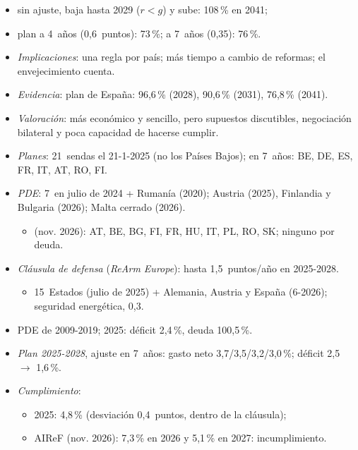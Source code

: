 \documentclass{article}
\begin{document}
\begin{columnas}
\begin{itemize}
\begin{itemize}
  \item sin ajuste, baja hasta 2029 ($r<g$) y sube: 108\,\% en 2041;
  \item plan a 4~años (0,6~puntos): 73\,\%; a 7~años (0,35): 76\,\%.
  \end{itemize}
\end{itemize}
\begin{itemize}
\item \emph{Implicaciones}: una regla por país; más tiempo a cambio de reformas; el envejecimiento cuenta.
\item \emph{Evidencia}: plan de España: 96,6\,\% (2028), 90,6\,\% (2031), 76,8\,\% (2041).
\item \emph{Valoración}: más económico y sencillo, pero supuestos discutibles, negociación bilateral y poca capacidad de hacerse cumplir.
\end{itemize}
\begin{itemize}
\item \emph{Planes}: 21~sendas el 21-1-2025 (no los Países Bajos); en 7~años: BE, DE, ES, FR, IT, AT, RO, FI.
\item \emph{PDE}: 7~en julio de 2024 + Rumanía (2020); Austria (2025), Finlandia y Bulgaria (2026); Malta cerrado (2026).
  \begin{itemize}
  \item {} (nov. 2026): AT, BE, BG, FI, FR, HU, IT, PL, RO, SK; ninguno por deuda.
  \end{itemize}
\item \emph{Cláusula de defensa} (\emph{ReArm Europe}): hasta 1,5~puntos/año en 2025-2028.
  \begin{itemize}
  \item 15~Estados (julio de 2025) + Alemania, Austria y España (6-2026); seguridad energética, 0,3.
  \end{itemize}
\end{itemize}
\begin{itemize}
\item PDE de 2009-2019; 2025: déficit 2,4\,\%, deuda 100,5\,\%.
\item \emph{Plan 2025-2028}, ajuste en 7~años: gasto neto 3,7/3,5/3,2/3,0\,\%; déficit 2,5 $\to$ 1,6\,\%.
\item \emph{Cumplimiento}:
  \begin{itemize}
  \item 2025: 4,8\,\% (desviación 0,4~puntos, dentro de la cláusula);
  \item AIReF (nov. 2026): 7,3\,\% en 2026 y 5,1\,\% en 2027: incumplimiento.
  \end{itemize}
\end{itemize}


\end{columnas}
\end{document}
